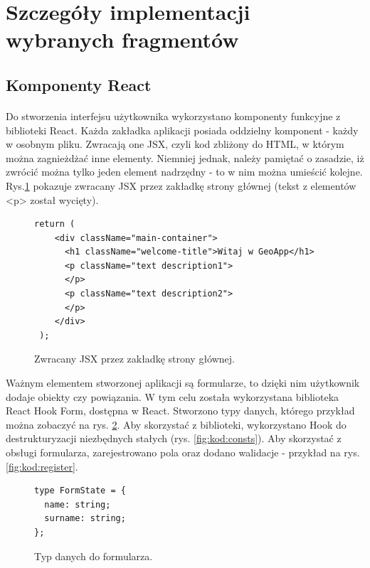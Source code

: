 \section{Szczegóły implementacji wybranych fragmentów}

\subsection{Komponenty React}
\paragraph{}
Do stworzenia interfejsu użytkownika wykorzystano komponenty funkcyjne z biblioteki React. Każda zakładka aplikacji posiada oddzielny komponent - każdy w osobnym pliku. Zwracają one JSX, czyli kod zbliżony do HTML, w którym można zagnieżdżać inne elementy. Niemniej jednak, należy pamiętać o zasadzie, iż zwrócić można tylko jeden element nadrzędny - to w nim można umieścić kolejne. Rys.\ref{fig:kod:jsx} pokazuje zwracany JSX przez zakładkę strony głównej (tekst z elementów <p> został wycięty).

\begin{figure}
\centering
\begin{lstlisting}
return (
    <div className="main-container">
      <h1 className="welcome-title">Witaj w GeoApp</h1>
      <p className="text description1">
      </p>
      <p className="text description2">
      </p>
    </div>
 );
\end{lstlisting}
\caption{Zwracany JSX przez zakładkę strony głównej.}
\label{fig:kod:jsx}
\end{figure}


Ważnym elementem stworzonej aplikacji są formularze, to dzięki nim użytkownik dodaje obiekty czy powiązania. W tym celu została wykorzystana biblioteka React Hook Form, dostępna w React. Stworzono typy danych, którego przykład można zobaczyć na rys. \ref{fig:kod:formType}. Aby skorzystać z biblioteki, wykorzystano Hook do destrukturyzacji niezbędnych stałych (rys. \ref{fig:kod:consts}). Aby skorzystać z obsługi formularza, zarejestrowano pola oraz dodano walidacje - przykład na rys. \ref{fig:kod:register}.

\begin{figure}
\centering
\begin{lstlisting}
type FormState = {
  name: string;
  surname: string;
};
\end{lstlisting}
\caption{Typ danych do formularza.}
\label{fig:kod:formType}
\end{figure}

